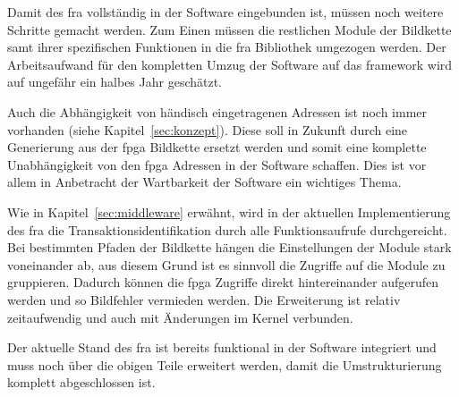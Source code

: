 
Damit des \ac{fra} vollständig in der Software eingebunden ist, müssen noch weitere Schritte gemacht werden. Zum Einen müssen die restlichen Module der Bildkette samt ihrer spezifischen Funktionen in die \ac{fra} Bibliothek umgezogen werden. Der Arbeitsaufwand für den kompletten Umzug der Software auf das \gls{framework} wird auf ungefähr ein halbes Jahr geschätzt.

Auch die Abhängigkeit von händisch eingetragenen Adressen ist noch immer vorhanden (siehe Kapitel~\ref{sec:konzept}). Diese soll in Zukunft durch eine Generierung aus der \ac{fpga} Bildkette ersetzt werden und somit eine komplette Unabhängigkeit von den \ac{fpga} Adressen in der Software schaffen. Dies ist vor allem in Anbetracht der Wartbarkeit der Software ein wichtiges Thema.

Wie in Kapitel~\ref{sec:middleware} erwähnt, wird in der aktuellen Implementierung des \ac{fra} die Transaktionsidentifikation durch alle Funktionsaufrufe durchgereicht. Bei bestimmten Pfaden der Bildkette hängen die Einstellungen der Module stark voneinander ab, aus diesem Grund ist es sinnvoll die Zugriffe auf die Module zu gruppieren. Dadurch können die \ac{fpga} Zugriffe direkt hintereinander aufgerufen werden und so Bildfehler vermieden werden.
Die Erweiterung ist relativ zeitaufwendig und auch mit Änderungen im Kernel verbunden.


Der aktuelle Stand des \ac{fra} ist bereits funktional in der Software integriert und muss noch über die obigen Teile erweitert werden, damit die Umstrukturierung komplett abgeschlossen ist.




















